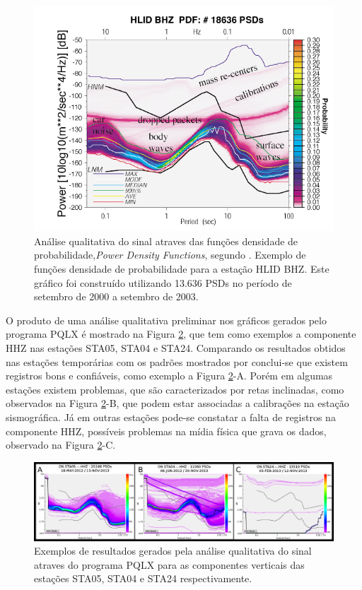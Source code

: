 \begin{figure}[!ht]
\centering
\includegraphics[scale=0.7]{Figs/mcnamura_buland.png}
\caption[Análise qualitativa do sinal através das funções densidade de probabilidade]{Análise qualitativa do sinal atraves das funções densidade de probabilidade,\textit{Power Density Functions}, segundo \cite{McNamara_Buland_2004}. Exemplo de funções densidade de probabilidade para a estação HLID BHZ. Este gráfico foi construído utilizando 13.636 PSDs no período de setembro de 2000 a setembro de 2003.}
\label{PQLX}
\end{figure}

O produto de uma análise qualitativa preliminar nos gráficos gerados pelo programa PQLX é mostrado na Figura \ref{PQLX_results}, que tem como exemplos a componente HHZ nas estações STA05, STA04 e STA24. Comparando os resultados obtidos nas estações temporárias com os padrões mostrados por \cite{McNamara_Buland_2004} conclui-se que existem registros bons e confiáveis, como exemplo a Figura \ref{PQLX_results}-A. Porém em algumas estações existem problemas, que são caracterizados por retas inclinadas, como observados na Figura \ref{PQLX_results}-B, que podem estar associadas a calibrações na estação sismográfica. Já em outras estações pode-se constatar a falta de registros na componente HHZ, possíveis problemas na mídia física que grava os dados, observado na Figura \ref{PQLX_results}-C.

\begin{figure}[!ht]
\centering
\includegraphics[scale=0.3]{Figs/pqlx_results.png}
\caption{Exemplos de resultados gerados pela análise qualitativa do sinal atraves do programa PQLX para as componentes verticais das estações STA05, STA04 e STA24 respectivamente.}
\label{PQLX_results}
\end{figure}


